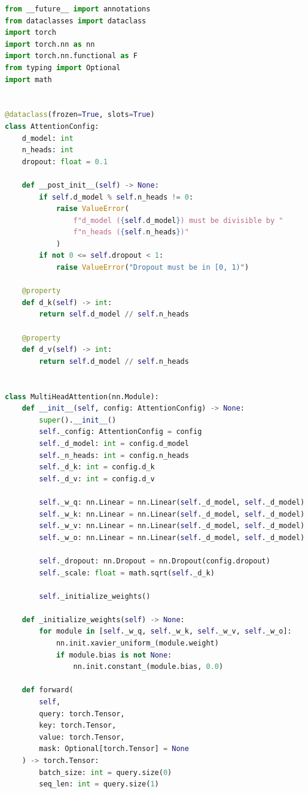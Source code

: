 \documentclass[11pt]{article}
\begin{document}
\begin{lstlisting}[language=Python, caption=Multi-Head Attention Implementation]
from __future__ import annotations
from dataclasses import dataclass
import torch
import torch.nn as nn
import torch.nn.functional as F
from typing import Optional
import math


@dataclass(frozen=True, slots=True)
class AttentionConfig:
    d_model: int
    n_heads: int
    dropout: float = 0.1
    
    def __post_init__(self) -> None:
        if self.d_model % self.n_heads != 0:
            raise ValueError(
                f"d_model ({self.d_model}) must be divisible by "
                f"n_heads ({self.n_heads})"
            )
        if not 0 <= self.dropout < 1:
            raise ValueError("Dropout must be in [0, 1)")
    
    @property
    def d_k(self) -> int:
        return self.d_model // self.n_heads
    
    @property
    def d_v(self) -> int:
        return self.d_model // self.n_heads


class MultiHeadAttention(nn.Module):
    def __init__(self, config: AttentionConfig) -> None:
        super().__init__()
        self._config: AttentionConfig = config
        self._d_model: int = config.d_model
        self._n_heads: int = config.n_heads
        self._d_k: int = config.d_k
        self._d_v: int = config.d_v
        
        self._w_q: nn.Linear = nn.Linear(self._d_model, self._d_model)
        self._w_k: nn.Linear = nn.Linear(self._d_model, self._d_model)
        self._w_v: nn.Linear = nn.Linear(self._d_model, self._d_model)
        self._w_o: nn.Linear = nn.Linear(self._d_model, self._d_model)
        
        self._dropout: nn.Dropout = nn.Dropout(config.dropout)
        self._scale: float = math.sqrt(self._d_k)
        
        self._initialize_weights()
    
    def _initialize_weights(self) -> None:
        for module in [self._w_q, self._w_k, self._w_v, self._w_o]:
            nn.init.xavier_uniform_(module.weight)
            if module.bias is not None:
                nn.init.constant_(module.bias, 0.0)
    
    def forward(
        self, 
        query: torch.Tensor,
        key: torch.Tensor,
        value: torch.Tensor,
        mask: Optional[torch.Tensor] = None
    ) -> torch.Tensor:
        batch_size: int = query.size(0)
        seq_len: int = query.size(1)
        

\end{lstlisting}
\end{document}
